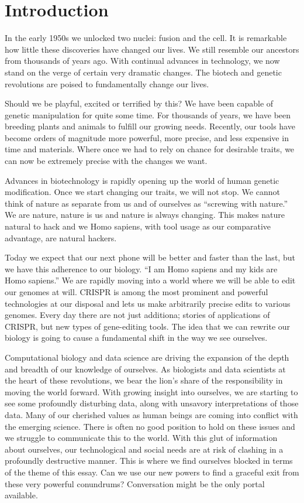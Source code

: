\section{Introduction}
\label{sec:introduction}

In the early 1950s we unlocked two nuclei: fusion and the cell.
It is remarkable how little these discoveries have changed our lives.
We still resemble our ancestors from thousands of years ago.
With continual advances in technology, we now stand on the verge of certain very dramatic changes.
The biotech and genetic revolutions are poised to fundamentally change our lives.

Should we be playful, excited or terrified by this?
We have been capable of genetic manipulation for quite some time.
For thousands of years, we have been breeding plants and animals to fulfill our growing needs.
Recently, our tools have become orders of magnitude more powerful, more precise, and less expensive in time and materials.
Where once we had to rely on chance for desirable traits, we can now be extremely precise with the changes we want.

Advances in biotechnology is rapidly opening up the world of human genetic modification.
Once we start changing our traits, we will not stop.
We cannot think of nature as separate from us and of ourselves as ``screwing with nature.''
We are nature, nature is us and nature is always changing.
This makes nature natural to hack and we Homo sapiens, with tool usage as our comparative advantage, are natural hackers.

Today we expect that our next phone will be better and faster than the last, but we have this adherence to our biology.
``I am Homo sapiens and my kids are Homo sapiens.''
We are rapidly moving into a world where we will be able to edit our genomes at will.
CRISPR is among the most prominent and powerful technologies at our disposal and lets us make arbitrarily precise edits to various genomes.
Every day there are not just additiona; stories of applications of CRISPR, but new types of gene-editing tools.
The idea that we can rewrite our biology is going to cause a fundamental shift in the way we see ourselves.

Computational biology and data science are driving the expansion of the depth and breadth of our knowledge of ourselves.
As biologists and data scientists at the heart of these revolutions, we bear the lion's share of the responsibility in moving the world forward.
With growing insight into ourselves, we are starting to see some profoundly disturbing data, along with unsavory interpretations of those data.
Many of our cherished values as human beings are coming into conflict with the emerging science.
There is often no good position to hold on these issues and we struggle to communicate this to the world.
With this glut of information about ourselves, our technological and social needs are at risk of clashing in a profoundly destructive manner.
This is where we find ourselves blocked in terms of the theme of this essay.
Can we use our new powers to find a graceful exit from these very powerful conundrums?
Conversation might be the only portal available.


